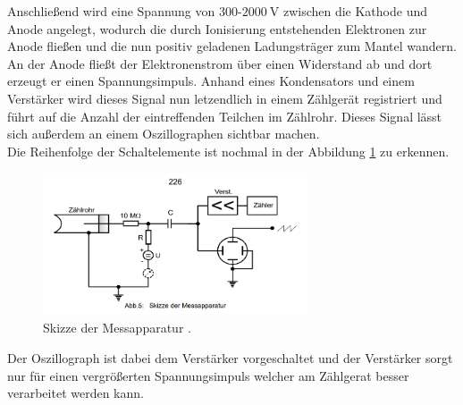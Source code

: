 Anschließend wird eine Spannung von $300$-$\SI{2000}{\volt}$ zwischen die Kathode und Anode angelegt, wodurch die durch Ionisierung entstehenden Elektronen zur Anode fließen
und die nun positiv geladenen Ladungsträger zum Mantel wandern. An der Anode fließt der Elektronenstrom über einen Widerstand ab und dort erzeugt er einen Spannungsimpuls.
Anhand eines Kondensators und einem Verstärker wird dieses Signal nun letzendlich in einem Zählgerät registriert und führt auf die Anzahl der eintreffenden Teilchen im Zählrohr.
Dieses Signal lässt sich außerdem an einem Oszillographen sichtbar machen.
\newline
\\
Die Reihenfolge der Schaltelemente ist nochmal in der Abbildung \ref{fig:geigermuellerpic2} zu erkennen.
\begin{figure}
  \centering
  \includegraphics[width=0.7\textwidth]{bilder/Abbildung2.png}
  \caption{Skizze der Messapparatur \cite{ap03}.}
  \label{fig:geigermuellerpic2}
\end{figure}
Der Oszillograph ist dabei dem Verstärker vorgeschaltet und der Verstärker sorgt nur für einen vergrößerten Spannungsimpuls welcher am Zählgerat besser verarbeitet werden kann.


